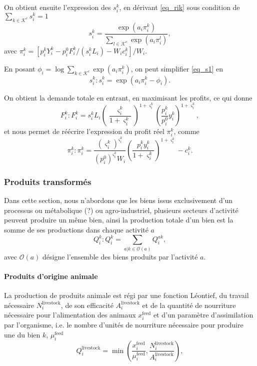 On obtient ensuite l’expression des $s_i^k$, en dérivant \ref{eq_rik} sous condition de $\sum_{k\in \mathcal{K}^c} s_i^k = 1$
\begin{equation}\label{eq_s1}
	s_i^k = \frac{\exp(a_i \pi_i^k)}{\sum_{l \in \mathcal{K}^c} \exp(a_i \pi_i^l)},
\end{equation}
avec $\pi_i^k = [p_i^k Y_i^k - p_i^0 F_i^k/(s_i^k L_i) - W_i c_i^k]/W_i$.

En posant $\phi_i = \log \sum_{k \in \mathcal{K}^c} \exp(a_i \pi_i^k)$, on peut simplifier \ref{eq_s1} en
\begin{equation}\label{eq_sik}
	s_i^k: s_i^k = \exp(a_i \pi_i^k - \phi_i).
\end{equation}

On obtient la demande totale en entrant, en maximisant les profits, ce qui donne
\begin{equation}
	F_i^k: F_i^k = s_i^k L_i \left( \frac{\varsigma_i^k}{1+\varsigma_i^k} \right)^{1+\varsigma_i^k} \left( \frac{p_i^k}{p_i^0} y_i^k \right)^{1+\varsigma_i^k},
\end{equation}
et nous permet de réécrire l’expression du profit réel $\pi_i^k$, comme
\begin{equation}
	\pi_i^k : \pi_i^k = \frac{\left( \varsigma_i^k \right)^{\varsigma_i^k}}{\left(  p_i^0 \right)^{\varsigma_i^k}W_i} \left( \frac{p_i^k y_i^k}{1+\varsigma_i^k }\right)^{1+\varsigma_i^k} - c_i^k.
\end{equation}


\subsubsection{Produits transformés}
Dans cette section, nous n’abordons que les biens issus exclusivement d’un processus ou métabolique (?) ou agro-industriel, plusieurs secteurs d’activité peuvent produire un même bien, ainsi la production totale d’un bien est la somme de ses productions dans chaque activité $a$
\begin{equation}\label{eq_qik}
	Q_i^k: Q_i^k = \sum_{a|k\in \mathcal{O}(a)} Q_i^{ak},
\end{equation}
avec $\mathcal{O}(a)$ désigne l’ensemble des biens produits par l’activité $a$.

\paragraph{Produits d’origine animale} La production de produits animale est régi par une fonction Léontief, du travail nécessaire $N_i^\text{livestock}$, de son efficacité $A_i^\text{livestock}$ et de la quantité de nourriture nécessaire pour l’alimentation des animaux $x_i^\text{feed}$ et d’un paramètre d’assimilation par l’organisme, i.e. le nombre d’unités de nourriture nécessaire pour produire une du bien $k$, $\mu_i^\text{feed}$
\begin{equation}
	Q_i^{\text{livestock}} = \min \left(\frac{x^{\text{feed}}_i}{\mu^{\text{feed}}_i}, \frac{N_i^\text{livestock}}{A_i^\text{livestock}}\right),
\end{equation}

